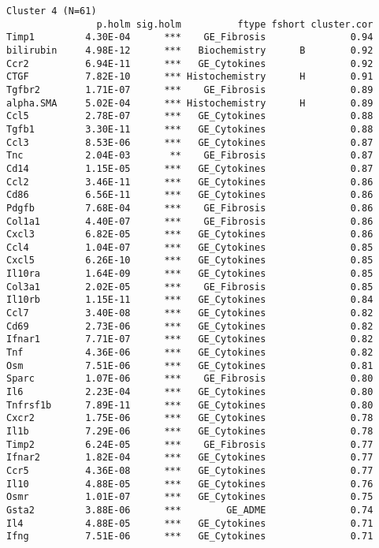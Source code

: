 \documentclass[]{article}
\begin{document}
\begin{verbatim}
Cluster 4 (N=61)
                p.holm sig.holm          ftype fshort cluster.cor
Timp1         4.30E-04      ***    GE_Fibrosis               0.94
bilirubin     4.98E-12      ***   Biochemistry      B        0.92
Ccr2          6.94E-11      ***   GE_Cytokines               0.92
CTGF          7.82E-10      *** Histochemistry      H        0.91
Tgfbr2        1.71E-07      ***    GE_Fibrosis               0.89
alpha.SMA     5.02E-04      *** Histochemistry      H        0.89
Ccl5          2.78E-07      ***   GE_Cytokines               0.88
Tgfb1         3.30E-11      ***   GE_Cytokines               0.88
Ccl3          8.53E-06      ***   GE_Cytokines               0.87
Tnc           2.04E-03       **    GE_Fibrosis               0.87
Cd14          1.15E-05      ***   GE_Cytokines               0.87
Ccl2          3.46E-11      ***   GE_Cytokines               0.86
Cd86          6.56E-11      ***   GE_Cytokines               0.86
Pdgfb         7.68E-04      ***    GE_Fibrosis               0.86
Col1a1        4.40E-07      ***    GE_Fibrosis               0.86
Cxcl3         6.82E-05      ***   GE_Cytokines               0.86
Ccl4          1.04E-07      ***   GE_Cytokines               0.85
Cxcl5         6.26E-10      ***   GE_Cytokines               0.85
Il10ra        1.64E-09      ***   GE_Cytokines               0.85
Col3a1        2.02E-05      ***    GE_Fibrosis               0.85
Il10rb        1.15E-11      ***   GE_Cytokines               0.84
Ccl7          3.40E-08      ***   GE_Cytokines               0.82
Cd69          2.73E-06      ***   GE_Cytokines               0.82
Ifnar1        7.71E-07      ***   GE_Cytokines               0.82
Tnf           4.36E-06      ***   GE_Cytokines               0.82
Osm           7.51E-06      ***   GE_Cytokines               0.81
Sparc         1.07E-06      ***    GE_Fibrosis               0.80
Il6           2.23E-04      ***   GE_Cytokines               0.80
Tnfrsf1b      7.89E-11      ***   GE_Cytokines               0.80
Cxcr2         1.75E-06      ***   GE_Cytokines               0.78
Il1b          7.29E-06      ***   GE_Cytokines               0.78
Timp2         6.24E-05      ***    GE_Fibrosis               0.77
Ifnar2        1.82E-04      ***   GE_Cytokines               0.77
Ccr5          4.36E-08      ***   GE_Cytokines               0.77
Il10          4.88E-05      ***   GE_Cytokines               0.76
Osmr          1.01E-07      ***   GE_Cytokines               0.75
Gsta2         3.88E-06      ***        GE_ADME               0.74
Il4           4.88E-05      ***   GE_Cytokines               0.71
Ifng          7.51E-06      ***   GE_Cytokines               0.71

\end{verbatim}
\end{document}
